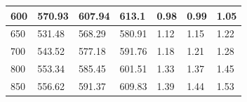 \begin{table}[H]
\begin{tabular}{|l|l|l|l|l|l|l|}
600              & 570.93               & 607.94               & 613.1                & 0.98              & 0.99              & 1.05              \\ \hline
650              & 531.48               & 568.29               & 580.91               & 1.12              & 1.15              & 1.22              \\ \hline
700              & 543.52               & 577.18               & 591.76               & 1.18              & 1.21              & 1.28              \\ \hline
800              & 553.34               & 585.45               & 601.51               & 1.33              & 1.37              & 1.45              \\ \hline
850              & 556.62               & 591.37               & 609.83               & 1.39              & 1.44              & 1.53              \\ \hline
\end{tabular}
\end{table}

